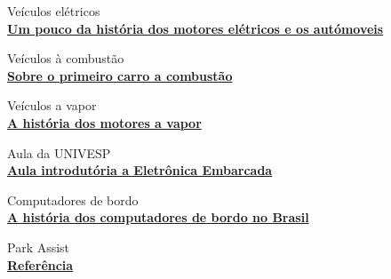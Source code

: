 \documentclass[12pt]{article}
\begin{document}
    \begin{thebibliography}{6}

        Veículos elétricos \\
        \href{https://pt.wikipedia.org/wiki/Ve%C3%ADculo_el%C3%A9trico}{\textbf{Um pouco da história dos motores elétricos e os autómoveis}} 
        
        Veículos à combustão \\
        \href{https://autoesporte.globo.com/carros/noticia/2016/01/130-anos-da-patente-do-primeiro-automovel.ghtml}{\textbf{Sobre o primeiro carro a combustão}}

        Veículos a vapor \\
        \href{http://www.sinaldetransito.com.br/curiosidades_foto.php?IDcuriosidade=38}{\textbf{A história dos motores a vapor}}
        
        Aula da UNIVESP \\
        \href{https://youtu.be/ElIMxXcFkGQ}{\textbf{Aula introdutória a Eletrônica Embarcada}}

        Computadores de bordo \\
        \href{https://loucosporcarro.com.br/computadores-de-bordo/}{\textbf{A história dos computadores de bordo no Brasil}}

        Park Assist \\
        \href{https://en.wikipedia.org/wiki/Intelligent_Parking_Assist_System}{\textbf{Referência}}
    \end{thebibliography}

    
\end{document}
